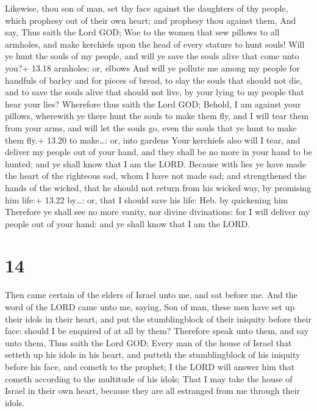  Likewise, thou son of man, set thy face against the
daughters of thy people, which prophesy out of their own heart; and
prophesy thou against them,  And say, Thus saith the Lord
GOD; Woe to the women that sew pillows to all armholes, and make
kerchiefs upon the head of every stature to hunt souls! Will ye hunt the
souls of my people, and will ye save the souls alive that come unto
you?+ 13.18 armholes: or, elbows  And will ye pollute me
among my people for handfuls of barley and for pieces of bread, to slay
the souls that should not die, and to save the souls alive that should
not live, by your lying to my people that hear your lies? 
Wherefore thus saith the Lord GOD; Behold, I am against your pillows,
wherewith ye there hunt the souls to make them fly, and I will tear them
from your arms, and will let the souls go, even the souls that ye hunt
to make them fly.+ 13.20 to make\ldots: or, into gardens 
Your kerchiefs also will I tear, and deliver my people out of your hand,
and they shall be no more in your hand to be hunted; and ye shall know
that I am the LORD.  Because with lies ye have made the
heart of the righteous sad, whom I have not made sad; and strengthened
the hands of the wicked, that he should not return from his wicked way,
by promising him life:+ 13.22 by\ldots: or, that I should save his life:
Heb. by quickening him  Therefore ye shall see no more
vanity, nor divine divinations: for I will deliver my people out of your
hand: and ye shall know that I am the LORD.

\hypertarget{section-13}{%
\section{14}\label{section-13}}

 Then came certain of the elders of Israel unto me, and sat
before me.  And the word of the LORD came unto me, saying,
 Son of man, these men have set up their idols in their
heart, and put the stumblingblock of their iniquity before their face:
should I be enquired of at all by them?  Therefore speak
unto them, and say unto them, Thus saith the Lord GOD; Every man of the
house of Israel that setteth up his idols in his heart, and putteth the
stumblingblock of his iniquity before his face, and cometh to the
prophet; I the LORD will answer him that cometh according to the
multitude of his idols;  That I may take the house of Israel
in their own heart, because they are all estranged from me through their
idols.

